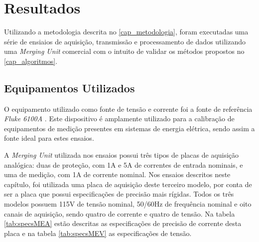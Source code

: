 



\chapter{Resultados}
\label{cap_resultados}

Utilizando a metodologia descrita no \autoref{cap_metodologia}, foram executadas uma série de ensiaios de aquisição, transmissão e processamento de dados utilizando uma \textit{Merging Unit} comercial com o intuito de validar os métodos propostos no \autoref{cap_algoritmos}. 

\section{Equipamentos Utilizados}

O equipamento utilizado como fonte de tensão e corrente foi a fonte de referência \textit{Fluke 6100A} \cite{fluke6100a}. Este dispositivo é amplamente utilizado para a calibração de equipamentos de medição presentes em sistemas de energia elétrica, sendo assim a fonte ideal para estes ensaios.

A \textit{Merging Unit} utilizada nos ensaios possui três tipos de placas de aquisição analógica: duas de proteção, com 1A e 5A de correntes de entrada nominais, e uma de medição, com 1A de corrente nominal. Nos ensaios descritos neste capítulo, foi utilizada uma placa de aquisição deste terceiro modelo, por conta de ser a placa que possui especificações de precisão mais rígidas. Todos os três modelos possuem 115V de tensão nominal, 50/60Hz de frequência nominal e oito canais de aquisição, sendo quatro de corrente e quatro de tensão. Na tabela \ref{tab:specsMEA} estão descritas as especificações de precisão de corrente desta placa e na tabela \ref{tab:specsMEV} as especificações de tensão.

